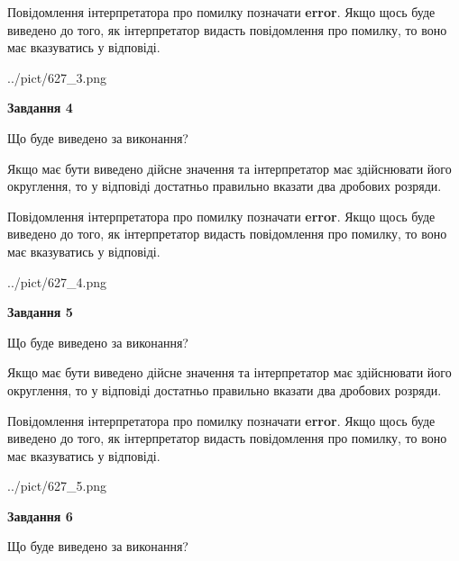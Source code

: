 \documentclass[12pt, ukrainian]{article}
\begin{document}
{\begin {Large}
Повідомлення інтерпретатора про помилку позначати \textbf{error}.
Якщо щось буде виведено до того, як інтерпретатор видасть повідомлення про помилку, 
то воно має вказуватись у відповіді. \par

\begin{center}
	{../pict/627_3.png}
\end{center}
\newpage

{\begin {center}\textbf{Завдання 4}\end {center}}\par
Що буде виведено за виконання? \par

Якщо має бути виведено дійсне значення та інтерпретатор має здійснювати його округлення, 
то у відповіді достатньо правильно вказати два дробових розряди.

Повідомлення інтерпретатора про помилку позначати \textbf{error}.
Якщо щось буде виведено до того, як інтерпретатор видасть повідомлення про помилку, 
то воно має вказуватись у відповіді. \par

\begin{center}
	{../pict/627_4.png}
\end{center}
\newpage

{\begin {center}\textbf{Завдання 5}\end {center}}\par
Що буде виведено за виконання? \par

Якщо має бути виведено дійсне значення та інтерпретатор має здійснювати його округлення, 
то у відповіді достатньо правильно вказати два дробових розряди.

Повідомлення інтерпретатора про помилку позначати \textbf{error}.
Якщо щось буде виведено до того, як інтерпретатор видасть повідомлення про помилку, 
то воно має вказуватись у відповіді. \par

\begin{center}
	{../pict/627_5.png}
\end{center}
\newpage

{\begin {center}\textbf{Завдання 6}\end {center}}\par
Що буде виведено за виконання? \par


\end{Large}}
\end{document}
